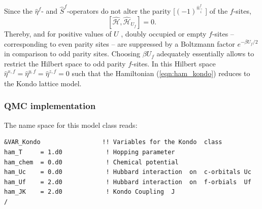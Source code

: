  Since the $\hat{\eta}^{f} $- and $ \hat{S}^{f} $-operators  do not alter the  parity [$(-1)^{\hat{n}^{f}_{\vec{i}}}$ ] of the $f$-sites, 
 \begin{equation}
 	\left[  \hat{\mathcal{H}}, \hat{\mathcal{H}}_{U_f} \right] = 0.
 \end{equation}
 Thereby,  and for positive values of $U$ ,  doubly occupied  or empty $f$-sites -- corresponding to even parity sites -- are suppressed  by a  Boltzmann factor 
 $e^{-\beta U_f/2} $ in comparison to odd parity sites.   Choosing $\beta U_f $ adequately essentially allows to  restrict the Hilbert space to  odd parity $f$-sites.  
 In this Hilbert space $\hat{\eta}^{x,f} = \hat{\eta}^{y,f} =  \hat{\eta}^{z,f} =0$  such that the Hamiltonian (\ref{eqn:ham_kondo}) reduces to the Kondo lattice model. 


\subsubsection*{ QMC implementation } 

The name space for this model class  reads: 

\begin{lstlisting}[style=fortran,escapechar=\#,breaklines=true]
&VAR_Kondo                 !! Variables for the Kondo  class
ham_T     = 1.d0            ! Hopping parameter
ham_chem  = 0.d0            ! Chemical potential
ham_Uc    = 0.d0            ! Hubbard interaction  on  c-orbitals Uc
ham_Uf    = 2.d0            ! Hubbard interaction  on  f-orbials  Uf
ham_JK    = 2.d0            ! Kondo Coupling  J
/
\end{lstlisting}


